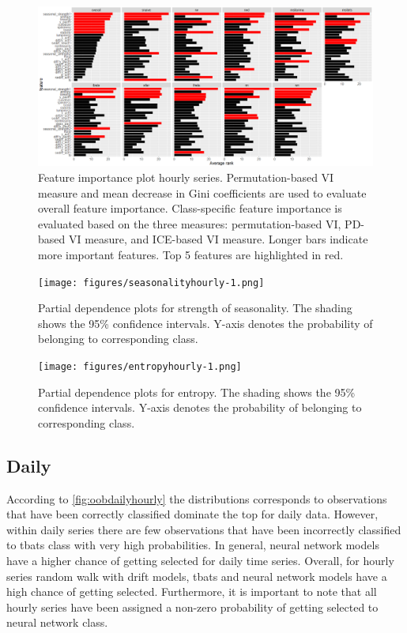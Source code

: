 \documentclass[11pt,a4paper,]{article}
\begin{document}
\begin{figure}
\centering
\includegraphics{figures/vihourly-1.png}
\caption{\label{fig:vihourly}Feature importance plot hourly series.
Permutation-based VI measure and mean decrease in Gini coefficients are
used to evaluate overall feature importance. Class-specific feature
importance is evaluated based on the three measures: permutation-based
VI, PD-based VI measure, and ICE-based VI measure. Longer bars indicate
more important features. Top 5 features are highlighted in red.}
\end{figure}

\begin{figure}
\centering
\texttt{[image: figures/seasonalityhourly-1.png]}
\caption{\label{fig:seasonalityhourly}Partial dependence plots for strength
of seasonality. The shading shows the 95\% confidence intervals. Y-axis
denotes the probability of belonging to corresponding class.}
\end{figure}

\begin{figure}
\centering
\texttt{[image: figures/entropyhourly-1.png]}
\caption{\label{fig:entropyhourly}Partial dependence plots for entropy. The
shading shows the 95\% confidence intervals. Y-axis denotes the
probability of belonging to corresponding class.}
\end{figure}

\subsection{Daily}\label{daily}

According to \autoref{fig:oobdailyhourly} the distributions corresponds
to observations that have been correctly classified dominate the top for
daily data. However, within daily series there are few observations that
have been incorrectly classified to tbats class with very high
probabilities. In general, neural network models have a higher chance of
getting selected for daily time series. Overall, for hourly series
random walk with drift models, tbats and neural network models have a
high chance of getting selected. Furthermore, it is important to note
that all hourly series have been assigned a non-zero probability of
getting selected to neural network class.
\end{document}

